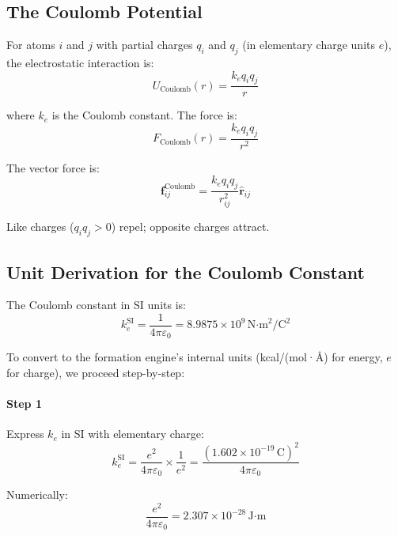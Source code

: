 \documentclass[11pt]{article}
\begin{document}
\subsection{The Coulomb Potential}

For atoms $i$ and $j$ with partial charges $q_i$ and $q_j$ (in elementary charge units $e$), the electrostatic interaction is:
\begin{equation}
U_{\text{Coulomb}}(r) = \frac{k_e q_i q_j}{r}
\end{equation}

where $k_e$ is the Coulomb constant. The force is:
\begin{equation}
F_{\text{Coulomb}}(r) = \frac{k_e q_i q_j}{r^2}
\end{equation}

The vector force is:
\begin{equation}
\mathbf{f}_{ij}^{\text{Coulomb}} = \frac{k_e q_i q_j}{r_{ij}^2} \hat{\mathbf{r}}_{ij}
\end{equation}

Like charges ($q_i q_j > 0$) repel; opposite charges attract.

\subsection{Unit Derivation for the Coulomb Constant}

The Coulomb constant in SI units is:
\begin{equation}
k_e^{\text{SI}} = \frac{1}{4\pi\varepsilon_0} = 8.9875 \times 10^9\,\text{N·m}^2/\text{C}^2
\end{equation}

To convert to the formation engine's internal units (kcal/(mol·\AA) for energy, $e$ for charge), we proceed step-by-step:

\paragraph{Step 1} Express $k_e$ in SI with elementary charge:
\begin{equation}
k_e^{\text{SI}} = \frac{e^2}{4\pi\varepsilon_0} \times \frac{1}{e^2} = \frac{(1.602 \times 10^{-19}\,\text{C})^2}{4\pi\varepsilon_0}
\end{equation}

Numerically:
\begin{equation}
\frac{e^2}{4\pi\varepsilon_0} = 2.307 \times 10^{-28}\,\text{J·m}
\end{equation}
\end{document}
